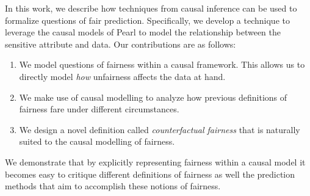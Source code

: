 In this work, we describe how techniques from causal inference can be used to formalize questions of fair prediction. Specifically, we develop a technique to leverage the causal models of Pearl \cite{pearl2009causal} to model the relationship between the sensitive attribute and data. Our contributions are as follows:
\begin{enumerate}
    \item We model questions of fairness within a causal framework. This allows us to directly model \emph{how} unfairness affects the data at hand.
    \item 


    We make use of causal modelling to analyze how previous definitions of fairness fare under different circumstances.
    \item We design a novel definition called \emph{counterfactual fairness} that is naturally suited to the causal modelling of fairness.
\end{enumerate}
We demonstrate that by explicitly representing fairness within a causal model it becomes easy to critique different definitions of fairness as well the prediction methods that aim to accomplish these notions of fairness.












